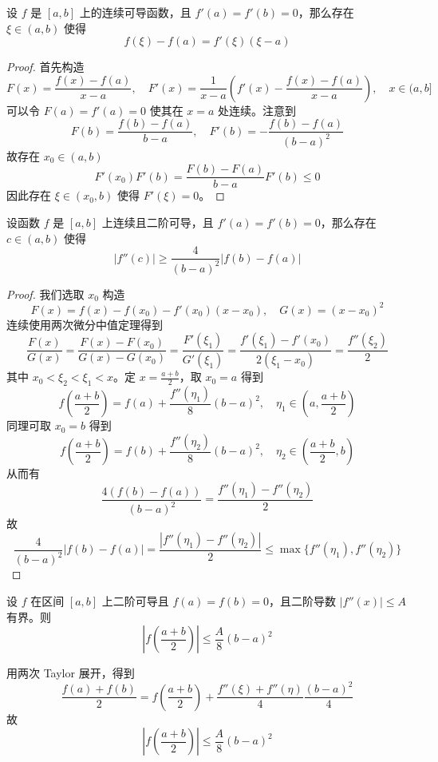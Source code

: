 \begin{problem}[000041]
设 $f$ 是 $[a,b]$ 上的连续可导函数，且 $f'(a) = f'(b) = 0$，那么存在 $\xi \in (a,b)$ 使得
\[ f(\xi) - f(a) = f'(\xi)(\xi - a) \]
\end{problem}

\begin{proof}
	首先构造
	\[ F(x) = \frac{f(x) - f(a)}{x - a}, \quad F'(x) = \frac{1}{x-a} \left(f'(x) - \frac{f(x) - f(a)}{x-a}\right), \quad x \in (a, b] \]
	可以令 $F(a) = f'(a) = 0$ 使其在 $x=a$ 处连续。注意到
	\[ F(b) = \frac{f(b) - f(a)}{b-a}, \quad F'(b) = -\frac{f(b) - f(a)}{(b-a)^2} \]
	故存在 $x_0 \in (a, b)$
	\[ F'(x_0) F'(b) = \frac{F(b) - F(a)}{b - a} F'(b) \leqslant 0 \]
	因此存在 $\xi \in (x_0, b)$ 使得 $F'(\xi) = 0$。
\end{proof}

\begin{problem}[000042]
设函数 $f$ 是 $[a,b]$ 上连续且二阶可导，且 $f'(a) = f'(b) = 0$，那么存在 $c \in (a,b)$ 使得
\[ |f''(c)| \geqslant \frac{4}{(b-a)^2} |f(b) - f(a)| \]
\end{problem}

\begin{proof}
	我们选取 $x_0$ 构造
	\[ F(x) = f(x) - f(x_0) - f'(x_0)(x-x_0) , \quad G(x) = (x-x_0)^2 \]
	连续使用两次微分中值定理得到
	\[ \frac{F(x)}{G(x)} = \frac{F(x) - F(x_0)}{G(x) - G(x_0)} = \frac{F'(\xi_1)}{G'(\xi_1)} = \frac{f'(\xi_1) - f'(x_0)}{2 (\xi_1 - x_0)} = \frac{f''(\xi_2)}{2} \]
	其中 $x_0 < \xi_2 < \xi_1 < x$。定 $x=\frac{a+b}{2}$，取 $x_0 = a$ 得到
	\[ f\left(\frac{a+b}{2}\right) = f(a) + \frac{f''(\eta_1)}{8} (b-a)^2, \quad \eta_1 \in \left(a, \frac{a+b}{2}\right) \]
	同理可取 $x_0 = b$ 得到
	\[ f\left(\frac{a+b}{2}\right) = f(b) + \frac{f''(\eta_2)}{8} (b-a)^2, \quad \eta_2 \in \left(\frac{a+b}{2}, b\right) \]
	从而有
	\[ \frac{4(f(b) - f(a))}{(b-a)^2} = \frac{f''(\eta_1) - f''(\eta_2)}{2} \]
	故
	\[ \frac{4}{(b-a)^2}|f(b) - f(a)| = \frac{|f''(\eta_1) - f''(\eta_2)|}{2} \leqslant \max\{f''(\eta_1), f''(\eta_2)\} \]
\end{proof}

\begin{problem}[000043]
设 $f$ 在区间 $[a, b]$ 上二阶可导且 $f(a) = f(b) = 0$，且二阶导数 $|f''(x)| \leqslant A$ 有界。则
\[ \left| f\left(\frac{a+b}{2}\right) \right| \leqslant \frac{A}{8}(b- a)^2 \]
\end{problem}

\begin{solution}
	用两次 Taylor 展开，得到
	\[ \frac{f(a) + f(b)}{2} = f\left(\frac{a+b}{2}\right) + \frac{f''(\xi) + f''(\eta)}{4}\frac{(b - a)^2}{4} \]
	故
	\[ \left| f\left(\frac{a+b}{2}\right) \right| \leqslant \frac{A}{8}(b- a)^2 \]
\end{solution}

